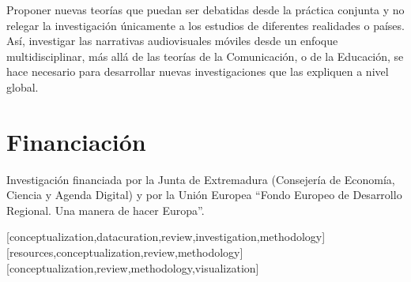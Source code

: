 \documentclass[spanish]{textolivre}
\begin{document}
Proponer nuevas teorías que puedan ser debatidas desde la práctica conjunta y no relegar la investigación únicamente a los estudios de diferentes realidades o países. Así, investigar las narrativas audiovisuales móviles desde un enfoque multidisciplinar, más allá de las teorías de la Comunicación, o de la Educación, se hace necesario para  desarrollar nuevas investigaciones que las expliquen a nivel global. 

\section{Financiación}
Investigación financiada por la Junta de Extremadura (Consejería de Economía, Ciencia y Agenda Digital) y por la Unión Europea “Fondo Europeo de Desarrollo Regional. Una manera de hacer Europa”.


\printbibliography\label{sec-bib}


\begin{contributors}
[conceptualization,datacuration,review,investigation,methodology]
[resources,conceptualization,review,methodology]
[conceptualization,review,methodology,visualization]
\end{contributors}
\end{document}
